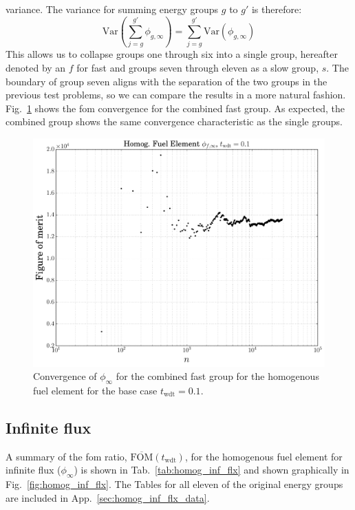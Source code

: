 variance.  The variance for summing energy groups $g$ to $g'$ is therefore:
\begin{equation*}
  \mathrm{Var}\left( \sum_{j=g}^{g'}\phi_{g,\infty}\right) =   \sum_{j=g}^{g'}\mathrm{Var}\left(\phi_{g,\infty}\right)
\end{equation*}
This allows us to collapse groups one through six into a single group,
hereafter denoted by an $f$ for fast and groups seven through eleven as
 a slow group, $s$. The boundary of group seven aligns with the separation
of the two groups in the previous test problems, so we can compare the
results in a more natural
fashion. Fig.~\ref{fig:homog_fom_convergence_example} shows the
\gls{fom} convergence for the combined fast group. As expected, the
combined group shows the same convergence characteristic as the single
groups.

\begin{figure}[hbtp]
  \centering
  \includegraphics[scale=0.5]{images/homog_fom_convergence_example}
  \caption{Convergence of $\phi_{\infty}$ for the combined fast group
    for the homogenous fuel element for the base case
    $t_{\mathrm{wdt}} = 0.1$.}
  \label{fig:homog_fom_convergence_example}
\end{figure}

\subsection{Infinite flux}
\label{sec:homog_inf_flx}

A summary of the \gls{fom} ratio,
$\overline{\mathrm{FOM}}(t_{\mathrm{wdt}})$, for the homogenous fuel
element for infinite flux ($\phi_{\infty}$) is shown in
Tab.~\ref{tab:homog_inf_flx} and shown graphically in
Fig.~\ref{fig:homog_inf_flx}. The Tables for all eleven of the
original energy groups are included in
App.~\ref{sec:homog_inf_flx_data}.

